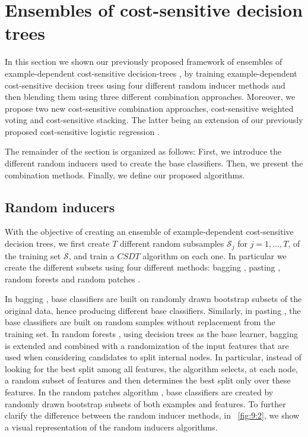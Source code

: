 {      
\section{Ensembles of cost-sensitive decision trees}
\label{sec:9:ecsdt}

In this section we shown our previously proposed framework of ensembles of  example-dependent 
cost-sensitive  decision-trees \citep{CorreaBahnsen2015b}, by training example-dependent 
cost-sensitive decision trees using four different  random inducer methods and then blending them 
using three different combination approaches. Moreover, we propose two new cost-sensitive 
combination approaches, cost-sensitive weighted  voting and cost-sensitive stacking. The latter 
being an extension of our previously proposed cost-sensitive logistic regression 
\citep{CorreaBahnsen2014b}. 

The remainder of the section is organized as follows: First, we introduce the different random 
inducers used to create the base classifiers. Then, we present the combination methods. Finally, we 
define our proposed algorithms.


\subsection{Random inducers}

With the objective of creating an ensemble of example-dependent cost-sensitive decision trees, we 
first create $T$ different random subsamples $\mathcal{S}_j$ for $j=1,\dots,T$, of the training  
set 
$\mathcal{S}$, and train a $CSDT$ algorithm on each one. In particular we create the different 
subsets using four different methods: bagging \citep{Breiman1996}, pasting \citep{Breiman1999}, 
random forests \citep{Breiman2001} and random patches \citep{Louppe2012}. 

In bagging \citep{Breiman1996}, base classifiers are built on randomly drawn bootstrap subsets of 
the original data, hence producing different base classifiers. Similarly, in pasting 
\citep{Breiman1999}, the base classifiers are built on random  samples without replacement from 
the training set. In random forests \citep{Breiman2001}, using decision trees as the base learner, 
bagging   is extended and   combined  with a  randomization of the input features that  are used 
when  considering candidates  to split    internal nodes. In particular, instead of looking for  
the best  split among all   features, the   algorithm selects, at each node, a random subset of 
features  and then determines   the best split only over  these features. In the random patches   
algorithm \citep{Louppe2012}, base classifiers are created by randomly     drawn bootstrap subsets 
of both examples and features. To further clarify the difference between the random inducer 
methods, in \figurename{~\ref{fig:9:2}}, we show a visual representation of the random inducers 
algorithms.
 
}
